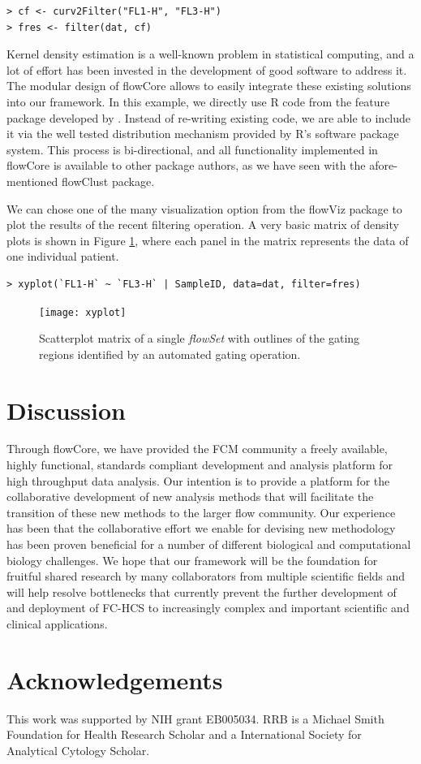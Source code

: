 \documentclass[12pt]{article}
\newcommand{\Rpackage}[1]{{\textsf{#1}}}
\newcommand{\Rclass}[1]{{\textit{#1}}}
\begin{document}
\begin{verbatim}
> cf <- curv2Filter("FL1-H", "FL3-H")
> fres <- filter(dat, cf)
\end{verbatim}

Kernel density estimation is a well-known problem in statistical
computing, and a lot of effort has been invested in the development of
good software to address it. The modular design of \Rpackage{flowCore}
allows to easily integrate these existing solutions into our
framework. In this example, we directly use R code from the
\Rpackage{feature} package developed by \cite{wand2008}. Instead of
re-writing existing code, we are able to include it via the well
tested distribution mechanism provided by R's software package
system. This process is bi-directional, and all functionality
implemented in \Rpackage{flowCore} is available to other package
authors, as we have seen with the afore-mentioned \Rpackage{flowClust}
package.

We can chose one of the many visualization option from the flowViz
package to plot the results of the recent filtering operation. A very
basic matrix of density plots is shown in Figure \ref{xyplot}, where
each panel in the matrix represents the data of one individual
patient.

\begin{verbatim}
> xyplot(`FL1-H` ~ `FL3-H` | SampleID, data=dat, filter=fres)
\end{verbatim}


\begin{figure}[htbp]
\centering
\texttt{[image: xyplot]}
\caption{\label{xyplot}%
  Scatterplot matrix of a single \Rclass{flowSet} with outlines of the
  gating regions identified by an automated gating operation.}
\end{figure}



\section*{Discussion}

Through \Rpackage{flowCore}, we have provided the FCM community a
freely available, highly functional, standards compliant development
and analysis platform for high throughput data analysis.  Our
intention is to provide a platform for the collaborative development
of new analysis methods that will facilitate the transition of these
new methods to the larger flow community.  Our experience has been
that the collaborative effort we enable for devising new methodology
has been proven beneficial for a number of different biological and
computational biology challenges.  We hope that our framework will be
the foundation for fruitful shared research by many collaborators from
multiple scientific fields and will help resolve bottlenecks that
currently prevent the further development of and deployment of FC-HCS
to increasingly complex and important scientific and clinical
applications.

\section*{Acknowledgements}
This work was supported by NIH grant EB005034. RRB is a Michael Smith
Foundation for Health Research Scholar and a International Society for
Analytical Cytology Scholar.

  
 
\end{document}
